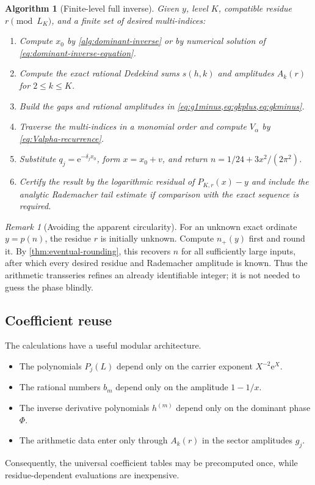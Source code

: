 \documentclass[11pt,a4paper]{article}
\numberwithin{equation}{section}
\newtheorem{algorithm}[theorem]{Algorithm}
\theoremstyle{remark}
\newtheorem{remark}[theorem]{Remark}
\newcommand{\e}{\mathrm e}
\begin{document}
\begin{algorithm}[Finite-level full inverse]\label{alg:full-inverse}
Given $y$, level $K$, compatible residue $r\pmod{L_K}$, and a finite set of desired multi-indices:
\begin{enumerate}
\item Compute $x_0$ by \cref{alg:dominant-inverse} or by numerical solution of \cref{eq:dominant-inverse-equation}.
\item Compute the exact rational Dedekind sums $s(h,k)$ and amplitudes $A_k(r)$ for $2\le k\le K$.
\item Build the gaps and rational amplitudes in \cref{eq:g1minus,eq:gkplus,eq:gkminus}.
\item Traverse the multi-indices in a monomial order and compute $V_\alpha$ by \cref{eq:Valpha-recurrence}.
\item Substitute $q_j=\e^{-\delta_jx_0}$, form $x=x_0+v$, and return $n=1/24+3x^2/(2\pi^2)$.
\item Certify the result by the logarithmic residual of $P_{K,r}(x)-y$ and include the analytic Rademacher tail estimate if comparison with the exact sequence is required.
\end{enumerate}
\end{algorithm}

\begin{remark}[Avoiding the apparent circularity]
For an unknown exact ordinate $y=p(n)$, the residue $r$ is initially unknown.  Compute $n_+(y)$ first and round it.  By \cref{thm:eventual-rounding}, this recovers $n$ for all sufficiently large inputs, after which every desired residue and Rademacher amplitude is known.  Thus the arithmetic transseries refines an already identifiable integer; it is not needed to guess the phase blindly.
\end{remark}

\subsection{Coefficient reuse}

The calculations have a useful modular architecture.
\begin{itemize}
\item The polynomials $P_j(L)$ depend only on the carrier exponent $X^{-2}\e^X$.
\item The rational numbers $b_m$ depend only on the amplitude $1-1/x$.
\item The inverse derivative polynomials $h^{(m)}$ depend only on the dominant phase $\Phi$.
\item The arithmetic data enter only through $A_k(r)$ in the sector amplitudes $g_j$.
\end{itemize}
Consequently, the universal coefficient tables may be precomputed once, while residue-dependent evaluations are inexpensive.
\end{document}
